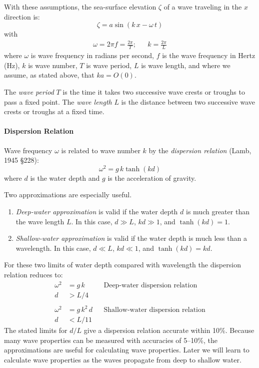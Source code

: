 With these assumptions, the sea-surface elevation $\zeta$ of a wave traveling in the
$x$ direction is:
\begin{equation}
\zeta = a \sin (k \, x - \omega \, t)
\end{equation}
with
\begin{eqnarray}
\omega = 2 \pi f = \frac{2 \pi}{T}; & & k = \frac{2 \pi}{L}
\end{eqnarray}
where $\omega$ is wave frequency in radians per second, $f$ is the wave
frequency in Hertz (Hz), $k$ is wave number, $T$ is wave period, $L$ is wave
length, and where we assume, as stated above, that $ka = O(0)$.

The \textit{wave period} $T$ is the time it takes two successive
wave crests or troughs to pass a fixed point. The \textit{wave
length} $L$ is the distance between two successive wave crests or
troughs at a fixed time.


\paragraph{Dispersion Relation}
Wave frequency
$\omega$ is related to wave number $k$ by the \textit{dispersion relation} (Lamb, 1945
\S{228}):
\begin{equation}
\omega ^{2} = g \, k \tanh (k d)
\end{equation}
where $d$ is the water depth and $g$ is the acceleration of gravity.

Two approximations are especially useful.
\begin{enumerate}
\item \textit{Deep-water approximation} is valid if the water depth $d$ is much
greater than the wave length $L$. In this case, $d \gg L$, $kd \gg 1$, and
$\tanh (kd) = 1$.
\item \textit{Shallow-water approximation} is valid if the water depth is much
less than a wavelength. In this case, $d \ll L$, $kd \ll 1$, and $\tanh (kd) =
kd$.
\end{enumerate}
For these two limits of water depth compared with wavelength the dispersion
relation reduces to:
\begin{align}
  \omega ^2 &= g \, k & & \text{Deep-water dispersion relation}\\
  d &> L/4 & &  \nonumber \\
   & & \nonumber \\
  \omega ^2 &= g \, k^{2} \, d & & \text{Shallow-water dispersion relation}\\
   d &< L/11 & & \nonumber
\end{align}
The stated limits for $d/L$  give a dispersion relation accurate within 10\%.
Because many wave properties can be measured with accuracies of 5--10\%, the
approximations are useful for calculating wave properties. Later we will
learn to calculate wave properties as the waves propagate from deep to
shallow water.

